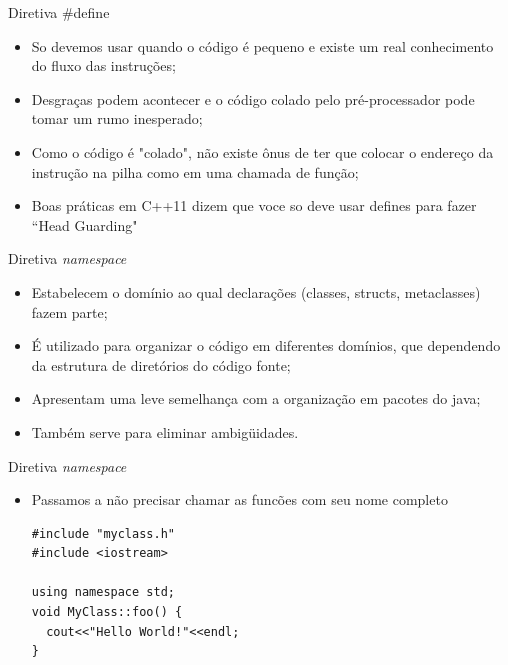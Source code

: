 \documentclass[12pt,table,xcolor={dvipsnames}]{beamer}
\begin{document}
\begin{frame}[fragile]{Diretiva \#define}
\begin{itemize}
\item So devemos usar quando o código é pequeno e existe um real conhecimento do fluxo das instruções;
\item Desgraças podem acontecer e o código colado pelo pré-processador pode tomar um rumo inesperado;
\item Como o código é "colado", não existe ônus de ter que colocar o endereço da instrução na pilha como em uma chamada de função;
\item Boas práticas em C++11 dizem que voce so deve usar defines para fazer ``Head Guarding"
\end{itemize}
\end{frame}

\begin{frame}[fragile]{Diretiva \textit{namespace}}
\begin{itemize}
\item Estabelecem o domínio ao qual declarações (classes, structs, metaclasses) fazem parte;
\item É utilizado para organizar o código em diferentes domínios, que dependendo da
estrutura de diretórios do código fonte;
\item Apresentam uma leve semelhança com a organização em pacotes do java;
\item Também serve para eliminar ambigüidades.
\end{itemize}
\end{frame}

\begin{frame}[fragile]{Diretiva \textit{namespace}}
\begin{itemize}
\begin{lstlisting}
#include "myclass.h"
#include <iostream>
void MyClass::foo() {
  std::cout<<"Hello World!"<<std::endl;
}\end{lstlisting}
\item Passamos a não precisar chamar as funcões com seu nome completo
\begin{lstlisting}
#include "myclass.h"
#include <iostream>

using namespace std;
void MyClass::foo() {
  cout<<"Hello World!"<<endl;
}
\end{lstlisting}

\end{itemize}
\end{frame}
\end{document}
